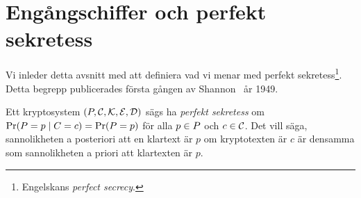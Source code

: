 \section{Engångschiffer och perfekt sekretess}
Vi inleder detta avsnitt med att definiera vad vi menar med perfekt 
sekretess\footnote{%
  Engelskans \emph{perfect secrecy}.
}.
Detta begrepp publicerades första gången av Shannon~\cite{Shannon1949cto} år 
1949.
\begin{definition}\label{def:perfectSecrecy}
  Ett kryptosystem \((\P, \C, \K, \E, \D)\) sägs ha \emph{perfekt sekretess} om 
  \(\Pr(\relax{P} = p\mid \relax{C} = c) = \Pr(\relax{P} = p)\) för alla \(p\in \P\) och \(c\in 
  \operatorname{\mathcal{C}}\).
  Det vill säga, sannolikheten a posteriori att en klartext är \(p\) om 
  kryptotexten är \(c\) är densamma som sannolikheten a priori att klartexten 
  är \(p\).
\end{definition}

